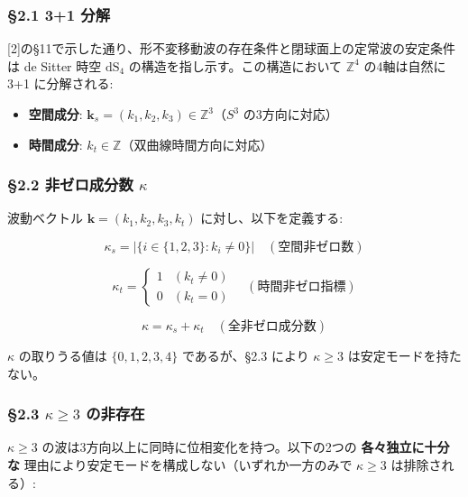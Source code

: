 \documentclass[
  a4paper,11pt]{ltjsarticle}
\providecommand{\tightlist}{%
  \setlength{\itemsep}{0pt}\setlength{\parskip}{0pt}}
\theoremstyle{definition}
\theoremstyle{remark}
\begin{document}
\subsubsection{§2.1 3+1 分解}\label{ux5206ux89e3}

{[}2{]}の§11で示した通り、形不変移動波の存在条件と閉球面上の定常波の安定条件は
de Sitter 時空 \(\mathrm{dS}_4\) の構造を指し示す。この構造において
\(\mathbb{Z}^4\) の4軸は自然に 3+1 に分解される:

\begin{itemize}
\tightlist
\item
  \textbf{空間成分}:
  \(\mathbf{k}_s = (k_1, k_2, k_3) \in \mathbb{Z}^3\)（\(S^3\)
  の3方向に対応）
\item
  \textbf{時間成分}: \(k_t \in \mathbb{Z}\)（双曲線時間方向に対応）
\end{itemize}

\subsubsection{\texorpdfstring{§2.2 非ゼロ成分数
\(\kappa\)}{§2.2 非ゼロ成分数 \textbackslash kappa}}\label{ux975eux30bcux30edux6210ux5206ux6570-kappa}

波動ベクトル \(\mathbf{k} = (k_1, k_2, k_3, k_t)\)
に対し、以下を定義する:

\[\kappa_s = |\{i \in \{1, 2, 3\} : k_i \neq 0\}| \quad (\text{空間非ゼロ数})\]

\[\kappa_t = \begin{cases} 1 & (k_t \neq 0) \\ 0 & (k_t = 0) \end{cases} \quad (\text{時間非ゼロ指標})\]

\[\kappa = \kappa_s + \kappa_t \quad (\text{全非ゼロ成分数})\]

\(\kappa\) の取りうる値は \(\{0, 1, 2, 3, 4\}\) であるが、§2.3 により
\(\kappa \geq 3\) は安定モードを持たない。

\subsubsection{\texorpdfstring{§2.3 \(\kappa \geq 3\)
の非存在}{§2.3 \textbackslash kappa \textbackslash geq 3 の非存在}}\label{kappa-geq-3-ux306eux975eux5b58ux5728}

\(\kappa \geq 3\) の波は3方向以上に同時に位相変化を持つ。以下の2つの
\textbf{各々独立に十分な}
理由により安定モードを構成しない（いずれか一方のみで \(\kappa \geq 3\)
は排除される）:
\end{document}
